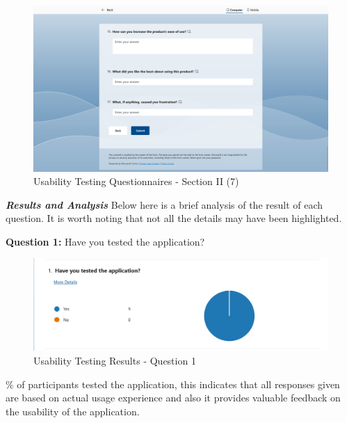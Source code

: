 \begin{justify}
\begin{figure}[H]
    \centerline{\includegraphics[width=150mm,scale=1]{figures/implementation_and_testing/testing/MUT/questions/Questions (9).png}}
    \caption{Usability Testing Questionnaires - Section II (7)}
    \label{Usability Testing Questionnaires - Section II (7)}
\end{figure}

\clearpage
\newendline \textbf{\textit{Results and Analysis}}\newendline
Below here is a brief analysis of the result of each question. It is worth noting that not all the details may have been highlighted.

\vspace{0.25cm}
\newendline \textbf{Question 1:} Have you tested the application?

\begin{figure}[H]
    \centerline{\includegraphics[width=150mm,scale=1]{figures/implementation_and_testing/testing/MUT/answers/Answers (1).png}}
    \caption{Usability Testing Results - Question 1}
    \label{Usability Testing Results - Question 1}
\end{figure}

\vspace{0.25cm}
\% of participants tested the application, this indicates that all responses given are based on actual usage experience and also it provides valuable feedback on the usability of the application.\\


\end{justify}
